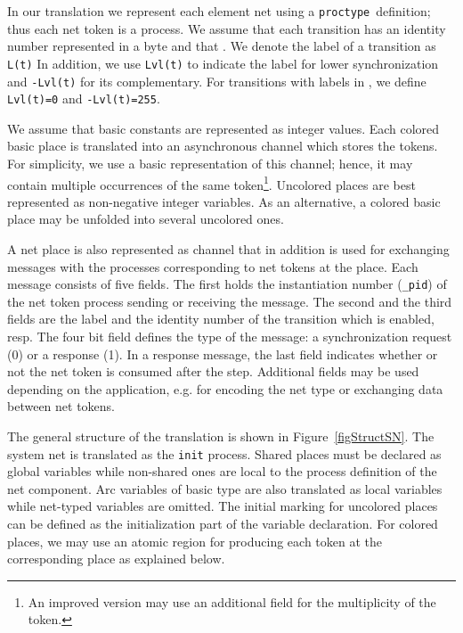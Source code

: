 \documentclass{llncs}
\begin{document}
In our translation we represent each element net using a \small\verb"proctype"\nfont\ definition; thus each net token is a process.  We assume that each transition has an identity number represented in a byte and that . We denote the label of a transition  as \verb"L(t)" In addition, we use \verb"Lvl(t)" to indicate the label for lower synchronization and \verb"-Lvl(t)" for  its complementary. For transitions with labels in , we define \verb"Lvl(t)=0" and \verb"-Lvl(t)=255". 


We assume that basic constants are represented as integer values. Each colored basic place is translated into an asynchronous channel which stores the tokens. For simplicity, we use a basic representation of this channel; hence, it may contain multiple occurrences of the same token\footnote{An improved version may use an additional field for the multiplicity of the token.}. Uncolored places are best represented as non-negative integer variables.  As an alternative, a colored basic place may be unfolded into several uncolored ones.

A net place is also represented as channel that in addition  is used for exchanging messages with the processes corresponding to net tokens at the place. Each message consists of five fields. The first holds the instantiation number (\small\verb"_pid"\nfont) of the net token process sending or receiving the message. The second and the third fields are the label and the identity number of the transition which is enabled, resp. The four bit field defines the type of the message: a synchronization request (0) or a response (1). In a response message, the last field indicates whether or not the net token is consumed after the step. Additional fields may be used depending on the application, e.g. for encoding the net type or exchanging data between net tokens.



The general structure of the translation is shown in Figure~\ref{figStructSN}. The system net is translated as the \verb"init" process. Shared places must be declared as global variables while non-shared ones are local to the process definition of the net component. Arc variables of basic type are also translated as local variables while net-typed variables are omitted. The initial marking for uncolored places can be defined as the initialization part of the variable declaration. For colored places, we may use an atomic region for producing each token at the corresponding place as explained below.
\end{document}

